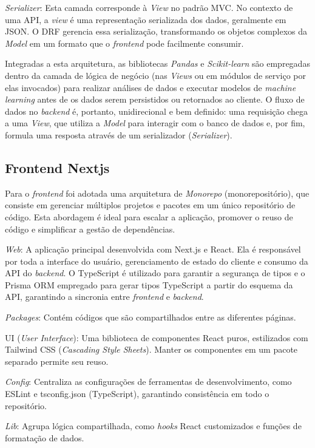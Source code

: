 \textit{Serializer}: Esta camada corresponde à \textit{View} no padrão MVC. No contexto de uma API, a \textit{view} é uma representação serializada dos dados, geralmente em JSON. O DRF gerencia essa serialização, transformando os objetos complexos da \textit{Model} em um formato que o \textit{frontend} pode facilmente consumir.

Integradas a esta arquitetura, as bibliotecas \textit{Pandas} e \textit{Scikit-learn} são empregadas dentro da camada de lógica de negócio (nas \textit{Views} ou em módulos de serviço por elas invocados) para realizar análises de dados e executar modelos de \textit{machine learning} antes de os dados serem persistidos ou retornados ao cliente. O fluxo de dados no \textit{backend} é, portanto, unidirecional e bem definido: uma requisição chega a uma \textit{View}, que utiliza a \textit{Model} para interagir com o banco de dados e, por fim, formula uma resposta através de um serializador (\textit{Serializer}).

\subsection[Frontend Nextjs]{Frontend Nextjs}
Para o \textit{frontend} foi adotada uma arquitetura de \textit{Monorepo} (monorepositório), que consiste em gerenciar múltiplos projetos e pacotes em um único repositório de código. Esta abordagem é ideal para escalar a aplicação, promover o reuso de código e simplificar a gestão de dependências.

\textit{Web}: A aplicação principal desenvolvida com Next.js e React. Ela é responsável por toda a interface do usuário, gerenciamento de estado do cliente e consumo da API do \textit{backend}. O TypeScript é utilizado para garantir a segurança de tipos e o Prisma ORM  empregado para gerar tipos TypeScript a partir do esquema da API, garantindo a sincronia entre \textit{frontend} e \textit{backend}.

\textit{Packages}: Contém códigos que são compartilhados entre as diferentes páginas.

UI (\textit{User Interface}): Uma biblioteca de componentes React puros, estilizados com Tailwind CSS (\textit{Cascading Style Sheets}). Manter os componentes em um pacote separado permite seu reuso.

\textit{Config}: Centraliza as configurações de ferramentas de desenvolvimento, como ESLint e tsconfig.json (TypeScript), garantindo consistência em todo o repositório.

\textit{Lib}: Agrupa lógica compartilhada, como \textit{hooks} React customizados e funções de formatação de dados.

